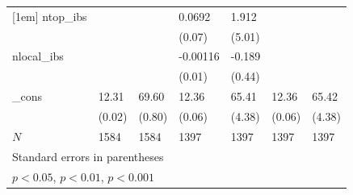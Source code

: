 {\begin{longtable}{|l|ll|ll|ll|}
            [1em]
            ntop\_ibs    &                     &                     &      0.0692         &       1.912         &                     &                     \\
                        &                     &                     &      (0.07)         &      (5.01)         &                     &                     \\
            [1em]
            nlocal\_ibs  &                     &                     &    -0.00116         &      -0.189         &                     &                     \\
                        &                     &                     &      (0.01)         &      (0.44)         &                     &                     \\
            [1em]
            \_cons      &       12.31\sym{***}&       69.60\sym{***}&       12.36\sym{***}&       65.41\sym{***}&       12.36\sym{***}&       65.42\sym{***}\\
                        &      (0.02)         &      (0.80)         &      (0.06)         &      (4.38)         &      (0.06)         &      (4.38)         \\
            \hline
            \(N\)       &        1584         &        1584         &        1397         &        1397         &        1397         &        1397         \\
            \hline\hline
        \multicolumn{7}{l}{\footnotesize Standard errors in parentheses}\\
        \multicolumn{7}{l}{\footnotesize \sym{*} \(p<0.05\), \sym{**} \(p<0.01\), \sym{***} \(p<0.001\)}\\
    \end{longtable}
    }
\endgroup
